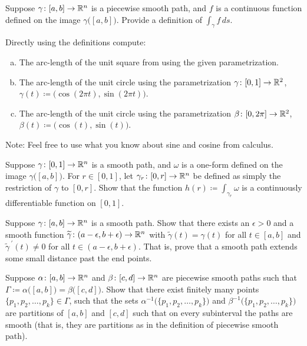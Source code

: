 \begin{exercise}
Suppose $\gamma \colon [a,b] \to {\mathbb{R}}^n$ is a piecewise smooth path, and $f$ is a
continuous function defined on the image $\gamma\bigl([a,b]\bigr)$.
Provide a definition of $\int_{\gamma} f \,ds$.
\end{exercise}

\begin{exercise}
Directly using the definitions compute:
\begin{enumerate}[a)]
\item
The arc-length of the unit square from
 using the given parametrization.
\item
The arc-length of the unit circle using the parametrization
$\gamma \colon [0,1] \to {\mathbb{R}}^2$, $\gamma(t) \coloneqq \bigl(\cos(2\pi t),\sin(2\pi t)\bigr)$.
\item
The arc-length of the unit circle using the parametrization
$\beta \colon [0,2\pi] \to {\mathbb{R}}^2$, $\beta(t) \coloneqq \bigl(\cos(t),\sin(t)\bigr)$.
\end{enumerate}
Note: Feel free to use what you know about sine and cosine from calculus.
\end{exercise}

\begin{exercise}
Suppose $\gamma \colon [0,1] \to {\mathbb{R}}^n$ is a smooth path, and
$\omega$ is a one-form defined on the image $\gamma\bigl([a,b]\bigr)$.
For $r \in [0,1]$, let $\gamma_r \colon [0,r] \to {\mathbb{R}}^n$ be defined
as simply the restriction of $\gamma$ to $[0,r]$.  Show that the
function $h(r) \coloneqq \int_{\gamma_r} \omega$ is a continuously
differentiable function on $[0,1]$.
\end{exercise}

\begin{exercise}
Suppose $\gamma \colon [a,b] \to {\mathbb{R}}^n$ is a smooth path.
Show that there exists an $\epsilon > 0$ and a smooth function
$\widetilde{\gamma} \colon (a-\epsilon,b+\epsilon) \to {\mathbb{R}}^n$
with $\widetilde{\gamma}(t) = \gamma(t)$ for all $t \in [a,b]$
and $\widetilde{\gamma}^{\:\prime}(t) \not= 0$ for all $t \in 
(a-\epsilon,b+\epsilon)$.  That is, prove that a smooth path extends
some small distance past the end points.
\end{exercise}

\begin{exercise} 
Suppose $\alpha \colon [a,b] \to {\mathbb{R}}^n$ and
$\beta \colon [c,d] \to {\mathbb{R}}^n$ are piecewise smooth paths such that
$\Gamma \coloneqq \alpha\bigl([a,b]\bigr) = \beta\bigl([c,d]\bigr)$.
Show that there exist finitely many points
$\{ p_1,p_2,\ldots,p_k\} \in \Gamma$, such that
the sets
$\alpha^{-1}\bigl( \{ p_1,p_2,\ldots,p_k\} \bigr)$
and
$\beta^{-1}\bigl( \{ p_1,p_2,\ldots,p_k\} \bigr)$
are partitions of $[a,b]$ and $[c,d]$ such that on every subinterval
the paths are smooth (that is, they are partitions as in the definition
of piecewise smooth path).
\end{exercise}

